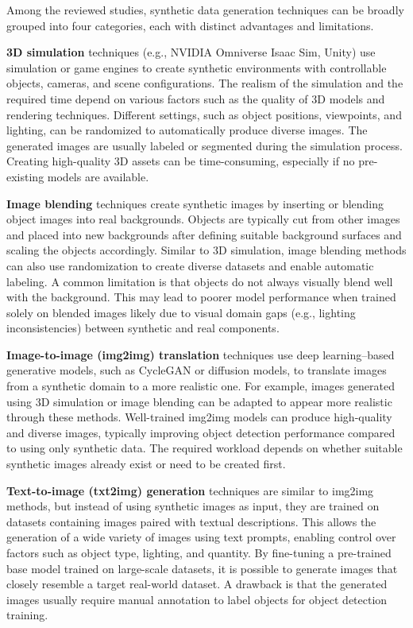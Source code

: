 Among the reviewed studies, synthetic data generation techniques can be broadly grouped into four categories, each with distinct advantages and limitations.

\textbf{3D simulation} techniques (e.g., NVIDIA Omniverse Isaac Sim, Unity) use simulation or game engines to create synthetic environments with controllable objects, cameras, and scene configurations. The realism of the simulation and the required time depend on various factors such as the quality of 3D models and rendering techniques. Different settings, such as object positions, viewpoints, and lighting, can be randomized to automatically produce diverse images. The generated images are usually labeled or segmented during the simulation process. Creating high-quality 3D assets can be time-consuming, especially if no pre-existing models are available.

\textbf{Image blending} techniques create synthetic images by inserting or blending object images into real backgrounds. Objects are typically cut from other images and placed into new backgrounds after defining suitable background surfaces and scaling the objects accordingly. Similar to 3D simulation, image blending methods can also use randomization to create diverse datasets and enable automatic labeling. A common limitation is that objects do not always visually blend well with the background. This may lead to poorer model performance when trained solely on blended images likely due to visual domain gaps (e.g., lighting inconsistencies) between synthetic and real components.

\textbf{Image-to-image (img2img) translation} techniques use deep learning–based generative models, such as CycleGAN or diffusion models, to translate images from a synthetic domain to a more realistic one. For example, images generated using 3D simulation or image blending can be adapted to appear more realistic through these methods. Well-trained img2img models can produce high-quality and diverse images, typically improving object detection performance compared to using only synthetic data. The required workload depends on whether suitable synthetic images already exist or need to be created first.

\textbf{Text-to-image (txt2img) generation} techniques are similar to img2img methods, but instead of using synthetic images as input, they are trained on datasets containing images paired with textual descriptions. This allows the generation of a wide variety of images using text prompts, enabling control over factors such as object type, lighting, and quantity. By fine-tuning a pre-trained base model trained on large-scale datasets, it is possible to generate images that closely resemble a target real-world dataset. A drawback is that the generated images usually require manual annotation to label objects for object detection training.

